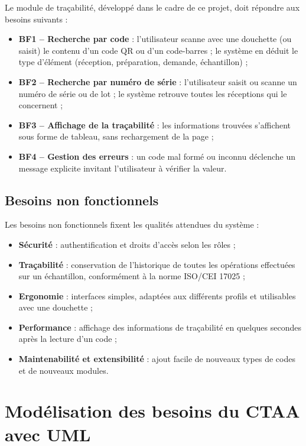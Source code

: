 Le module de traçabilité, développé dans le cadre de ce projet, doit répondre aux besoins suivants :
\begin{itemize}
    \item \textbf{BF1 -- Recherche par code} : l'utilisateur scanne avec une douchette (ou saisit) le contenu d'un code \ac{QR} ou d'un code-barres ; le système en déduit le type d'élément (réception, préparation, demande, échantillon) ;
    \item \textbf{BF2 -- Recherche par numéro de série} : l'utilisateur saisit ou scanne un numéro de série ou de lot ; le système retrouve toutes les réceptions qui le concernent ;
    \item \textbf{BF3 -- Affichage de la traçabilité} : les informations trouvées s'affichent sous forme de tableau, sans rechargement de la page ;
    \item \textbf{BF4 -- Gestion des erreurs} : un code mal formé ou inconnu déclenche un message explicite invitant l'utilisateur à vérifier la valeur.
\end{itemize}

\subsection{Besoins non fonctionnels}

Les besoins non fonctionnels fixent les qualités attendues du système :
\begin{itemize}
    \item \textbf{Sécurité} : authentification et droits d'accès selon les rôles ;
    \item \textbf{Traçabilité} : conservation de l'historique de toutes les opérations effectuées sur un échantillon, conformément à la norme \ac{ISO/CEI 17025} ;
    \item \textbf{Ergonomie} : interfaces simples, adaptées aux différents profils et utilisables avec une douchette ;
    \item \textbf{Performance} : affichage des informations de traçabilité en quelques secondes après la lecture d'un code ;
    \item \textbf{Maintenabilité et extensibilité} : ajout facile de nouveaux types de codes et de nouveaux modules.
\end{itemize}

\section{Modélisation des besoins du CTAA avec UML}

